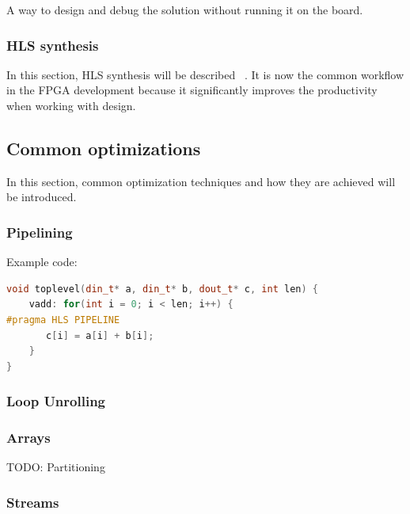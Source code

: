 \documentclass[a4paper, twoside]{report}
\theoremstyle{definition}
\numberwithin{equation}{section}
\begin{document}
A way to design and debug the solution without running it on the board.

\subsubsection{HLS synthesis}

In this section, HLS synthesis will be described ~\cite{AMD2023VitisHLS}. It is now the common workflow in the FPGA development because it significantly improves the productivity when working with design.


\subsection{Common optimizations}

In this section, common optimization techniques and how they are achieved will be introduced.




\subsubsection{Pipelining}


Example code:
\begin{lstlisting}[language=c++,numbers=none]
void toplevel(din_t* a, din_t* b, dout_t* c, int len) {
	vadd: for(int i = 0; i < len; i++) {
#pragma HLS PIPELINE
	   c[i] = a[i] + b[i];
	}
}
\end{lstlisting}

\subsubsection{Loop Unrolling}


\subsubsection{Arrays}

TODO: Partitioning

\subsubsection{Streams}
\end{document}
